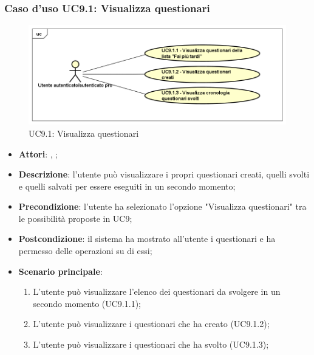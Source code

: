 	\subsubsection{Caso d'uso UC9.1: Visualizza questionari}
	\label{UC9.1}
	\begin{figure}[h]
		\centering
	\includegraphics[scale=0.5,keepaspectratio]{UML/UC9_1.png}
		\caption{UC9.1: Visualizza questionari}
	\end{figure}
	\FloatBarrier
	\begin{itemize}
		\item \textbf{Attori}: \uau, \uaupro;
		\item \textbf{Descrizione}: l'utente può visualizzare i propri questionari creati, quelli svolti e quelli salvati per essere eseguiti in un secondo momento; 
		\item \textbf{Precondizione}: l'utente ha selezionato l'opzione "Visualizza questionari" tra le possibilità proposte in UC9;
		\item \textbf{Postcondizione}: il sistema ha mostrato all'utente i questionari e ha permesso delle operazioni su di essi; 
		\item \textbf{Scenario principale}: 
			\begin{enumerate}
				\item L'utente può visualizzare l'elenco dei questionari da svolgere in un secondo momento (UC9.1.1);
				\item L'utente può visualizzare i questionari che ha creato (UC9.1.2); 
				\item L'utente può visualizzare i questionari che ha svolto (UC9.1.3); 
			\end{enumerate}
	\end{itemize}
	
